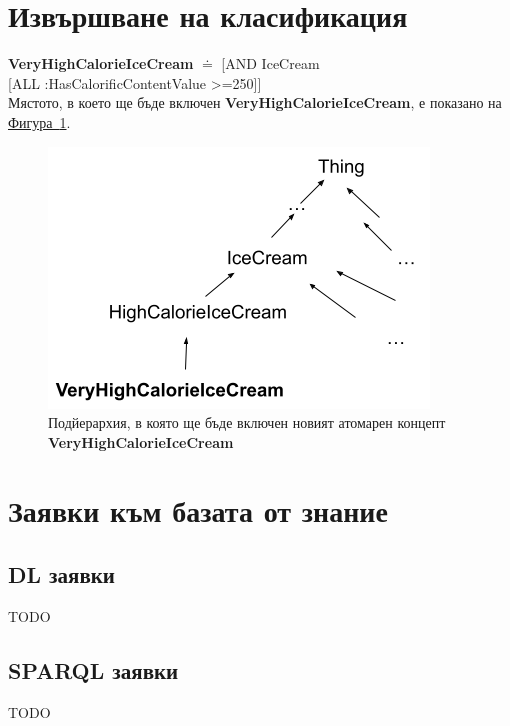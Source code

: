\documentclass[12pt]{article}
\newcommand*{\MyIndent}{\hspace*{7em}}
\begin{document}
\section{Извършване на класификация}

\textbf{VeryHighCalorieIceCream} $\doteq$ [AND IceCream \\
                                             \MyIndent \MyIndent [ALL :HasCalorificContentValue >=250]] \\

Мястото, в което ще бъде включен \textbf{VeryHighCalorieIceCream}, е показано на \hyperref[fig:hierarchy]{Фигура~\ref*{fig:hierarchy}}.

\begin{figure}
\centering
    \includegraphics[scale=0.7]{./images/hierarchy.png}
  \caption{Подйерархия, в която ще бъде включен новият атомарен концепт \textbf{VeryHighCalorieIceCream}}
  \label{fig:hierarchy}
\end{figure}

\section{Заявки към базата от знание}

\subsection{DL заявки}

TODO

\subsection{SPARQL заявки}

TODO
\end{document}
